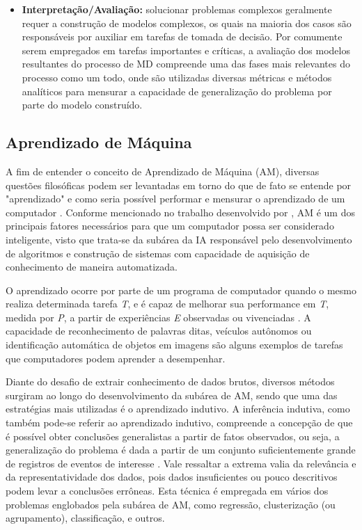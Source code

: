 \begin{itemize}
    \item \textbf{Interpretação/Avaliação:} solucionar problemas complexos geralmente requer a construção de modelos complexos, os quais na maioria dos casos são responsáveis por auxiliar em tarefas de tomada de decisão. Por comumente serem empregados em tarefas importantes e críticas, a avaliação dos modelos resultantes do processo de MD compreende uma das fases mais relevantes do processo como um todo, onde são utilizadas diversas métricas e métodos analíticos para mensurar a capacidade de generalização do problema por parte do modelo construído.
\end{itemize}

\subsection{Aprendizado de Máquina}
\label{Sec:aprendizado}

A fim de entender o conceito de Aprendizado de Máquina (AM), diversas questões filosóficas podem ser levantadas em torno do que de fato se entende por "aprendizado" e como seria possível performar e mensurar o aprendizado de um computador . Conforme mencionado no trabalho desenvolvido por , AM é um dos principais fatores necessários para que um computador possa ser considerado inteligente, visto que trata-se da subárea da IA responsável pelo desenvolvimento de algoritmos e construção de sistemas com capacidade de aquisição de conhecimento de maneira automatizada.

O aprendizado ocorre por parte de um programa de computador quando o mesmo realiza determinada tarefa \textit{T}, e é capaz de melhorar sua performance em \textit{T}, medida por \textit{P}, a partir de experiências \textit{E} observadas ou vivenciadas \cite{mitchell1997}. A capacidade de reconhecimento de palavras ditas, veículos autônomos ou identificação automática de objetos em imagens são alguns exemplos de tarefas que computadores podem aprender a desempenhar.

Diante do desafio de extrair conhecimento de dados brutos, diversos métodos surgiram ao longo do desenvolvimento da subárea de AM, sendo que uma das estratégias mais utilizadas é o aprendizado indutivo. A inferência indutiva, como também pode-se referir ao aprendizado indutivo, compreende a concepção de que é possível obter conclusões generalistas a partir de fatos observados, ou seja, a generalização do problema é dada a partir de um conjunto suficientemente grande de registros de eventos de interesse \cite{kantardzic2011}. Vale ressaltar a extrema valia da relevância e da representatividade dos dados, pois dados insuficientes ou pouco descritivos podem levar a conclusões errôneas. Esta técnica é empregada em vários dos problemas englobados pela subárea de AM, como regressão, clusterização (ou agrupamento), classificação, e outros.

